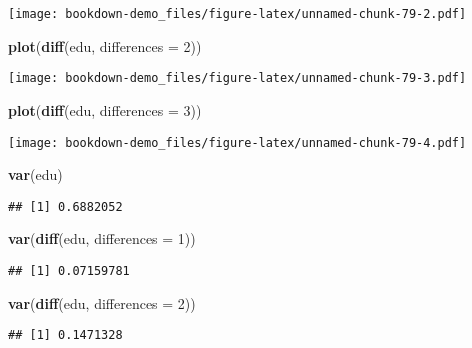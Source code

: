 \documentclass[]{book}
\newenvironment{Shaded}{\begin{snugshade}}{\end{snugshade}}
\newcommand{\KeywordTok}[1]{\textcolor[rgb]{0.13,0.29,0.53}{\textbf{#1}}}
\newcommand{\DataTypeTok}[1]{\textcolor[rgb]{0.13,0.29,0.53}{#1}}
\newcommand{\DecValTok}[1]{\textcolor[rgb]{0.00,0.00,0.81}{#1}}
\newcommand{\NormalTok}[1]{#1}
\theoremstyle{definition}
\theoremstyle{definition}
\theoremstyle{definition}
\theoremstyle{remark}
\begin{document}
\texttt{[image: bookdown-demo\_files/figure-latex/unnamed-chunk-79-2.pdf]}

\begin{Shaded}
\begin{Highlighting}[]
\KeywordTok{plot}\NormalTok{(}\KeywordTok{diff}\NormalTok{(edu, }\DataTypeTok{differences =} \DecValTok{2}\NormalTok{))}
\end{Highlighting}
\end{Shaded}

\texttt{[image: bookdown-demo\_files/figure-latex/unnamed-chunk-79-3.pdf]}

\begin{Shaded}
\begin{Highlighting}[]
\KeywordTok{plot}\NormalTok{(}\KeywordTok{diff}\NormalTok{(edu, }\DataTypeTok{differences =} \DecValTok{3}\NormalTok{))}
\end{Highlighting}
\end{Shaded}

\texttt{[image: bookdown-demo\_files/figure-latex/unnamed-chunk-79-4.pdf]}

\begin{Shaded}
\begin{Highlighting}[]
\KeywordTok{var}\NormalTok{(edu)}
\end{Highlighting}
\end{Shaded}

\begin{verbatim}
## [1] 0.6882052
\end{verbatim}

\begin{Shaded}
\begin{Highlighting}[]
\KeywordTok{var}\NormalTok{(}\KeywordTok{diff}\NormalTok{(edu, }\DataTypeTok{differences =} \DecValTok{1}\NormalTok{))}
\end{Highlighting}
\end{Shaded}

\begin{verbatim}
## [1] 0.07159781
\end{verbatim}

\begin{Shaded}
\begin{Highlighting}[]
\KeywordTok{var}\NormalTok{(}\KeywordTok{diff}\NormalTok{(edu, }\DataTypeTok{differences =} \DecValTok{2}\NormalTok{))}
\end{Highlighting}
\end{Shaded}

\begin{verbatim}
## [1] 0.1471328
\end{verbatim}
\end{document}
